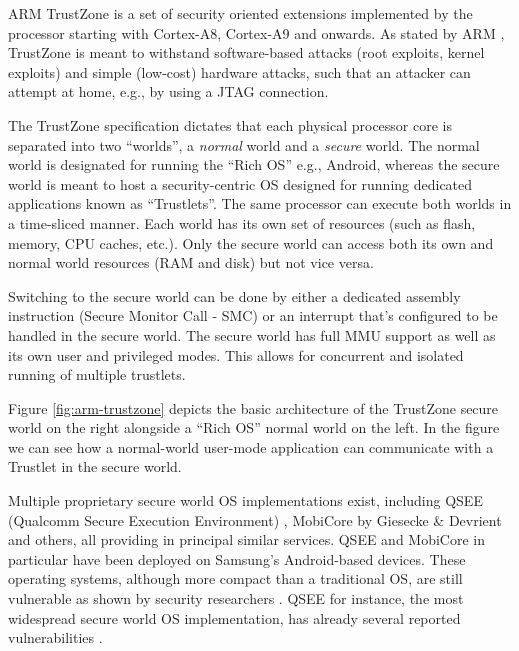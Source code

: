 \documentclass[11pt]{article}
\begin{document}
ARM TrustZone is a set of security oriented extensions implemented by the processor starting with Cortex-A8, Cortex-A9 and onwards.
As stated by ARM \cite{TrustZoneSecurityWhitepaper}, TrustZone is meant to withstand software-based attacks (root exploits, kernel exploits) 
and simple (low-cost) hardware attacks, such that an attacker can attempt at home, e.g., by using a JTAG connection.

The TrustZone specification dictates that each physical processor core is separated into two ``worlds'', a \emph{normal} world and a \emph{secure} world.
The normal world is designated for running the ``Rich OS'' e.g., Android, whereas the secure world is meant to host a security-centric 
OS designed for running dedicated applications known as ``Trustlets''.
The same processor can execute both worlds in a time-sliced manner.
Each world has its own set of resources (such as flash, memory, CPU caches, etc.).
Only the secure world can access both its own and normal world resources (RAM and disk) but not vice versa.

Switching to the secure world can be done by either a dedicated assembly instruction (Secure Monitor Call - SMC) or an 
interrupt that's configured to be handled in the secure world. The secure world has full MMU support as well as its own user and privileged modes.
This allows for concurrent and isolated running of multiple trustlets.

Figure \ref{fig:arm-trustzone} depicts the basic architecture of the TrustZone secure world on the right alongside a ``Rich OS'' normal world on the left. 
In the figure we can see how a normal-world user-mode application can communicate with a Trustlet in the secure world.

Multiple proprietary secure world OS implementations exist, including QSEE (Qualcomm Secure Execution Environment) \cite{QSEE}, 
MobiCore by Giesecke \& Devrient \cite{MobiCorePresentation, MobiCoreReview} and others, all providing in principal similar services.
QSEE and MobiCore \cite{MobiCoreGalaxy3} in particular have been deployed on Samsung's Android-based devices.
These operating systems, although more compact than a traditional OS, are still vulnerable as shown by security researchers 
\cite{NextGenerationMobileRootkits}. QSEE for instance, the most widespread secure world OS implementation, has already several reported vulnerabilities 
\cite{ReflectionsOnTrustingTrustZone, QSEEExploit1, QSEEExploit2, QSEEExploit3, QSEEExploit4, HereBeDragons}. 
\end{document}
